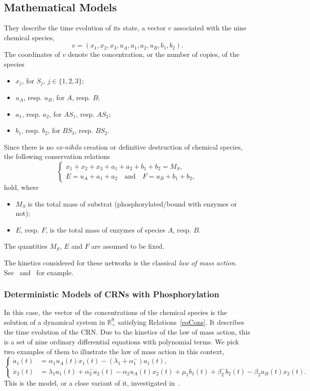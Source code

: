 \documentclass[english]{amsart}
\newcommand{\R}{\ensuremath{\mathbb{R}}}
\numberwithin{proposition}{section}
\begin{document}
\subsection{Mathematical Models}
They describe the time evolution of its state, a vector $v$ associated with the nine chemical species,
\[
v{=}(x_1,x_2,x_3,u_A,a_1,a_2,u_B,b_1,b_2).
\]
The coordinates of $v$ denote the concentration, or the number of copies,  of the species
\begin{itemize}
	\item $x_j$, for  ${ S}_j$, $j{\in}\{1, 2, 3\}$;
	\item $u_A$, resp. $u_B$,  for  ${ A}$, resp. ${ B}$;
	\item $a_{1}$, resp. $a_2$, for ${ AS}_{1}$, resp. ${ AS}_{2}$;
	\item $b_{1}$, resp. $b_2$, for ${ BS}_{3}$, resp. ${ BS}_{2}$.
\end{itemize}
Since there is no {\em ex-nihilo} creation or  definitive destruction of chemical species, the following conservation relations 
\begin{equation}\label{eqCons}
\begin{cases}
x_1+x_2+x_3+a_1+a_2+b_1+b_2=M_S,\\
E=u_A{+}a_1{+}a_2 \quad \text{and} \quad F=u_B{+}b_1{+}b_2,
\end{cases}
\end{equation}
hold, where
\begin{itemize}
\item $M_S$ is the total mass of substrat (phosphorylated/bound with enzymes or not);
\item $E$, resp. $F$,  is the total mass of enzymes of species ${ A}$, resp. ${ B}$.
\end{itemize}
The quantities $M_S$, $E$ and $F$ are assumed to be fixed. 

The kinetics considered for these networks is the classical {\em law of mass action}. See~\citet{guldberg1864studies} and~\citet{Voit2015} for example. 

\subsubsection{Deterministic Models of CRNs with Phosphorylation}\label{DetSec}

In this case, the vector of the concentrations of the chemical species is the solution of a dynamical system in $\R_+^9$ satisfying Relations~\eqref{eqCons}. It describes the time evolution of the CRN. Due to the kinetics of the law of mass action,  this is a set of nine ordinary differential equations with polynomial terms. We pick two examples of them to illustrate the law of mass action in this context,
\[
\begin{cases}
\dot{a}_1(t)&=\alpha_1 u_A(t)x_1(t)-(\lambda_1{+}\alpha_1^-)a_1(t),\\
\dot{x}_2(t)&=\lambda_1a_1(t)+\alpha_2^-a_2(t)-\alpha_2u_A(t)x_2(t) +\mu_1b_1(t)+\beta_2^-b_2(t)-\beta_2u_B(t)x_2(t).
\end{cases}
\]
This is the model, or a close variant of it, investigated in~\citet{Conradi2024,Feliu2022,Feliu2024}.
\end{document}
